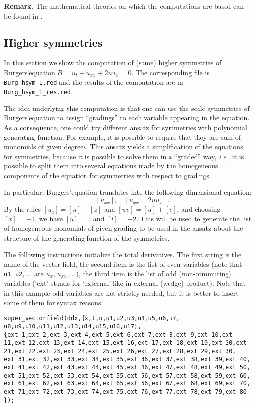 \documentclass[12pt]{amsart}
\theoremstyle{definition}
\begin{document}
\textbf{Remark.} The mathematical theories on which the computations are based
can be found in \cite{Many,KKV}.

\subsection{Higher symmetries}\label{sec:higher-symmetries}

In this section we show the computation of (some) higher symmetries of
Burgers'equation $B=u_t-u_{xx}+2uu_x=0$. The corresponding file is
\texttt{Burg\_hsym\_1.red} and the results of the computation are in
\texttt{Burg\_hsym\_1\_res.red}.

The idea underlying this computation is that one can use the scale symmetries
of Burgers'equation to assign ``gradings'' to each variable appearing in the
equation. As a consequence, one could try different ansatz for symmetries with
polynomial generating function. For example, it is possible to require that
they are sum of monomials of given degrees. This ansatz yields a simplification
of the equations for symmetries, because it is possible to solve them in a
``graded'' way, \emph{i.e.}, it is possible to split them into several
equations made by the homogeneous components of the equation for symmetries
with respect to gradings.

In particular, Burgers'equation translates into the following dimensional
equation:
\begin{displaymath}
  [u_t]=[u_{xx}],\quad [u_{xx}=2uu_x].
\end{displaymath}
By the rules $[u_z]=[u]-[z]$ and $[uv]=[u]+[v]$, and choosing $[x]=-1$, we have
$[u]=1$ and $[t]=-2$. This will be used to generate the list of homogeneous
monomials of given grading to be used in the ansatz about the structure of the
generating function of the symmetries.

The following instructions initialize the total derivatives. The first string
is the name of the vector field, the second item is the list of even variables
(note that \texttt{u1}, \texttt{u2}, ... are $u_x$, $u_{xx}$, \dots), the third
item is the list of odd (non-commuting) variables (`ext' stands for `external'
like in external (wedge) product). Note that in this example odd variables are
not strictly needed, but it is better to insert some of them for syntax reasons.
\begin{verbatim}
super_vectorfield(ddx,{x,t,u,u1,u2,u3,u4,u5,u6,u7,
u8,u9,u10,u11,u12,u13,u14,u15,u16,u17},
{ext 1,ext 2,ext 3,ext 4,ext 5,ext 6,ext 7,ext 8,ext 9,ext 10,ext
11,ext 12,ext 13,ext 14,ext 15,ext 16,ext 17,ext 18,ext 19,ext 20,ext
21,ext 22,ext 23,ext 24,ext 25,ext 26,ext 27,ext 28,ext 29,ext 30,
ext 31,ext 32,ext 33,ext 34,ext 35,ext 36,ext 37,ext 38,ext 39,ext 40,
ext 41,ext 42,ext 43,ext 44,ext 45,ext 46,ext 47,ext 48,ext 49,ext 50,
ext 51,ext 52,ext 53,ext 54,ext 55,ext 56,ext 57,ext 58,ext 59,ext 60,
ext 61,ext 62,ext 63,ext 64,ext 65,ext 66,ext 67,ext 68,ext 69,ext 70,
ext 71,ext 72,ext 73,ext 74,ext 75,ext 76,ext 77,ext 78,ext 79,ext 80
});
\end{verbatim}
\end{document}
